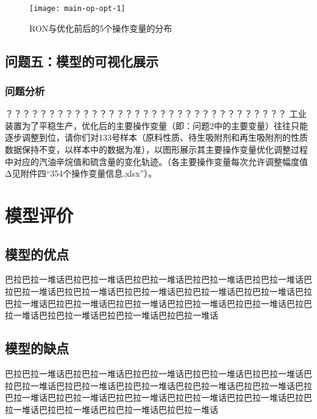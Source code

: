 \documentclass[bwprint]{gmcmthesis}
\begin{document}
\begin{figure}[htb]
	\centering
	\texttt{[image: main-op-opt-1]}
	\caption{RON与优化前后的5个操作变量的分布}
\end{figure}

\FloatBarrier
\subsection{问题五：模型的可视化展示}

\FloatBarrier
\subsubsection{问题分析}

？？？？？？？？？？？？？？？？？？？？？？？？？？？？？？？？？
工业装置为了平稳生产，优化后的主要操作变量（即：问题2中的主要变量）往往只能逐步调整到位，请你们对133号样本（原料性质、待生吸附剂和再生吸附剂的性质数据保持不变，以样本中的数据为准），以图形展示其主要操作变量优化调整过程中对应的汽油辛烷值和硫含量的变化轨迹。（各主要操作变量每次允许调整幅度值Δ见附件四“354个操作变量信息.xlsx”）。



\FloatBarrier
\section{模型评价}


\FloatBarrier
\subsection{模型的优点}
巴拉巴拉一堆话巴拉巴拉一堆话巴拉巴拉一堆话巴拉巴拉一堆话巴拉巴拉一堆话巴拉巴拉一堆话巴拉巴拉一堆话巴拉巴拉一堆话巴拉巴拉一堆话巴拉巴拉一堆话巴拉巴拉一堆话巴拉巴拉一堆话巴拉巴拉一堆话巴拉巴拉一堆话巴拉巴拉一堆话巴拉巴拉一堆话巴拉巴拉一堆话巴拉巴拉一堆话巴拉巴拉一堆话


\FloatBarrier
\subsection{模型的缺点}
巴拉巴拉一堆话巴拉巴拉一堆话巴拉巴拉一堆话巴拉巴拉一堆话巴拉巴拉一堆话巴拉巴拉一堆话巴拉巴拉一堆话巴拉巴拉一堆话巴拉巴拉一堆话巴拉巴拉一堆话巴拉巴拉一堆话巴拉巴拉一堆话巴拉巴拉一堆话巴拉巴拉一堆话巴拉巴拉一堆话巴拉巴拉一堆话巴拉巴拉一堆话巴拉巴拉一堆话巴拉巴拉一堆话






\end{document}
